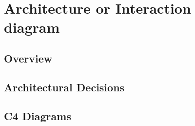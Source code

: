 \chapter{Architecture or Interaction diagram}

\section{Overview}

\section{Architectural Decisions}

\section{C4 Diagrams}

